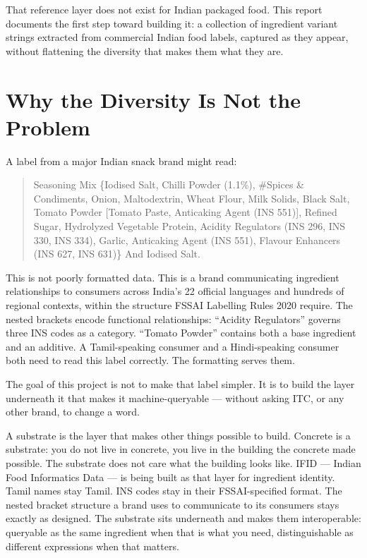 \documentclass[
  letterpaper,
  DIV=11,
  numbers=noendperiod]{scrartcl}
\begin{document}
That reference layer does not exist for Indian packaged food. This
report documents the first step toward building it: a collection of
ingredient variant strings extracted from commercial Indian food labels,
captured as they appear, without flattening the diversity that makes
them what they are.

\section{Why the Diversity Is Not the
Problem}\label{why-the-diversity-is-not-the-problem}

A label from a major Indian snack brand might read:

\begin{quote}
Seasoning Mix \{Iodised Salt, Chilli Powder (1.1\%), \#Spices \&
Condiments, Onion, Maltodextrin, Wheat Flour, Milk Solids, Black Salt,
Tomato Powder {[}Tomato Paste, Anticaking Agent (INS 551){]}, Refined
Sugar, Hydrolyzed Vegetable Protein, Acidity Regulators (INS 296, INS
330, INS 334), Garlic, Anticaking Agent (INS 551), Flavour Enhancers
(INS 627, INS 631)\} And Iodised Salt.
\end{quote}

This is not poorly formatted data. This is a brand communicating
ingredient relationships to consumers across India's 22 official
languages and hundreds of regional contexts, within the structure FSSAI
Labelling Rules 2020 require. The nested brackets encode functional
relationships: ``Acidity Regulators'' governs three INS codes as a
category. ``Tomato Powder'' contains both a base ingredient and an
additive. A Tamil-speaking consumer and a Hindi-speaking consumer both
need to read this label correctly. The formatting serves them.

The goal of this project is not to make that label simpler. It is to
build the layer underneath it that makes it machine-queryable ---
without asking ITC, or any other brand, to change a word.

A substrate is the layer that makes other things possible to build.
Concrete is a substrate: you do not live in concrete, you live in the
building the concrete made possible. The substrate does not care what
the building looks like. IFID --- Indian Food Informatics Data --- is
being built as that layer for ingredient identity. Tamil names stay
Tamil. INS codes stay in their FSSAI-specified format. The nested
bracket structure a brand uses to communicate to its consumers stays
exactly as designed. The substrate sits underneath and makes them
interoperable: queryable as the same ingredient when that is what you
need, distinguishable as different expressions when that matters.
\end{document}
